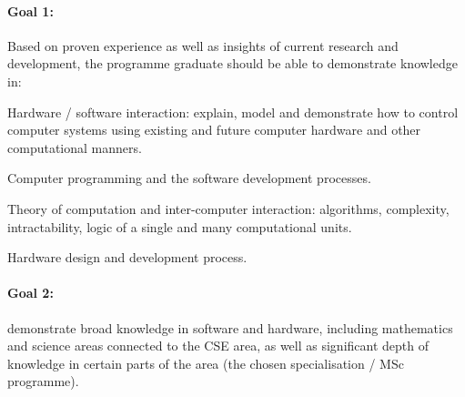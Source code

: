 
\paragraph{Goal 1:} Based on proven experience as well as insights of
current research and development, the programme graduate should be
able to demonstrate knowledge in:

Hardware / software interaction: explain, model and demonstrate how to
control computer systems using existing and future computer hardware
and other computational manners.

Computer programming and the software development processes.

Theory of computation and inter-computer interaction: algorithms,
complexity, intractability, logic of a single and many computational
units.

Hardware design and development process. 


%

\paragraph{Goal 2:} demonstrate broad knowledge in software and
hardware, including mathematics and science areas connected to the CSE
area, as well as significant depth of knowledge in certain parts of
the area (the chosen specialisation / MSc programme).

